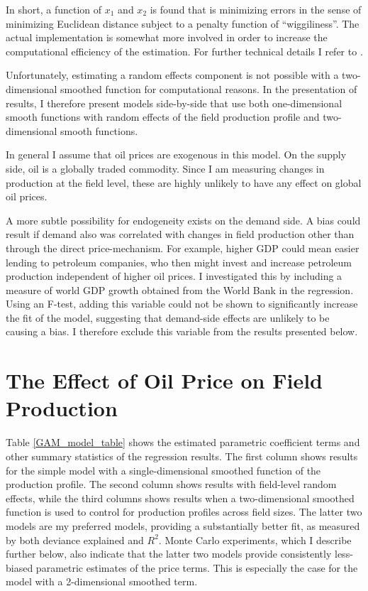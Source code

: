 \documentclass[11pt]{article}
\begin{document}
In short, a function of $x_1$ and $x_2$ is found that is minimizing errors in the sense of minimizing Euclidean distance subject to a penalty function of “wiggiliness”.  The actual implementation is somewhat more involved in order to increase the computational efficiency of the estimation.  For further technical details I refer to \citet{wood_thin_2003}. 

Unfortunately, estimating a random effects component is not possible with a two-dimensional smoothed function for computational reasons.  In the presentation of results, I therefore present models side-by-side that use both one-dimensional smooth functions with random effects of the field production profile and two-dimensional smooth functions.

In general I assume that oil prices are exogenous in this model. On the supply side, oil is a globally traded commodity.  Since I am measuring changes in production at the field level, these are highly unlikely to have any effect on global oil prices.

A more subtle possibility for endogeneity exists on the demand side. A bias could result if demand also was correlated with changes in field production other than through the direct price-mechanism. For example, higher GDP could mean easier lending to petroleum companies, who then might invest and increase petroleum production independent of higher oil prices. I investigated this by including a measure of world GDP growth obtained from the World Bank in the regression. Using an F-test, adding this variable could not be shown to significantly increase the fit of the model, suggesting that demand-side effects are unlikely to be causing a bias. I therefore exclude this variable from the results presented below.

\section{The Effect of Oil Price on Field Production}

Table \ref{GAM_model_table} shows the estimated parametric coefficient terms and other summary statistics of the regression results.  The first column shows results for the simple model with a single-dimensional smoothed function of the production profile.  The second column shows results with field-level random effects, while the third columns shows results when a two-dimensional smoothed function is used to control for production profiles across field sizes. The latter two models are my preferred models, providing a substantially better fit, as measured by both deviance explained and $R^2$. Monte Carlo experiments, which I describe further below, also indicate that the latter two models provide consistently less-biased parametric estimates of the price terms. This is especially the case for the model with a 2-dimensional smoothed term.
\end{document}
